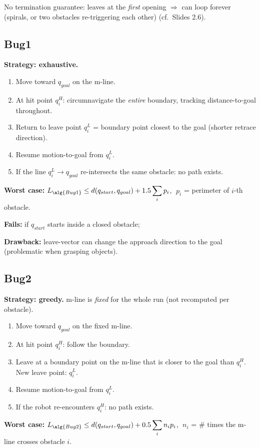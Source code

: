 
No termination guarantee: leaves at the \emph{first} opening $\Rightarrow$ can loop forever (spirals, or two obstacles re-triggering each other) (cf.\ Slides 2.6).

\subsection{Bug1}
\textbf{Strategy: exhaustive.}
\begin{enumerate}
\item Move toward $q_{goal}$ on the m-line.
\item At hit point $q_i^H$: circumnavigate the \emph{entire} boundary, tracking distance-to-goal throughout.
\item Return to leave point $q_i^L$ = boundary point closest to the goal (shorter retrace direction).
\item Resume motion-to-goal from $q_i^L$.
\item If the line $q_i^L\to q_{goal}$ re-intersects the same obstacle: no path exists.
\end{enumerate}
\textbf{Worst case:} $\displaystyle L_{\alg{Bug1}} \le d(q_{start},q_{goal}) + 1.5\sum_i p_i$, $\; p_i$ = perimeter of $i$-th obstacle.

\textbf{Fails:} if $q_{start}$ starts inside a closed obstacle;

\textbf{Drawback:} leave-vector can change the approach direction to the goal (problematic when grasping objects).

\subsection{Bug2}
\textbf{Strategy: greedy.} m-line is \emph{fixed} for the whole run (not recomputed per obstacle).
\begin{enumerate}
\item Move toward $q_{goal}$ on the fixed m-line.
\item At hit point $q_i^H$: follow the boundary.
\item Leave at a boundary point on the m-line that is closer to the goal than $q_i^H$. New leave point: $q_i^L$.
\item Resume motion-to-goal from $q_i^L$.
\item If the robot re-encounters $q_i^H$: no path exists.
\end{enumerate}
\textbf{Worst case:} $\displaystyle L_{\alg{Bug2}} \le d(q_{start},q_{goal}) + 0.5\sum_i n_i p_i$, $\; n_i$ = \# times the m-line crosses obstacle $i$.

